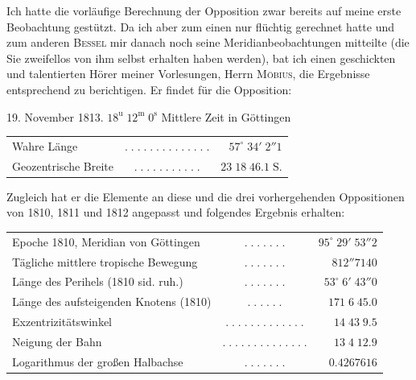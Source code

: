 \par\indent Ich hatte die vorläufige Berechnung der Opposition zwar bereits auf meine erste Beobachtung gestützt. Da ich aber zum einen nur flüchtig gerechnet hatte und zum anderen \textsc{Bessel} mir danach noch seine Meridianbeobachtungen mitteilte (die Sie zweifellos von ihm selbst erhalten haben werden), bat ich einen geschickten und talentierten Hörer meiner Vorlesungen, Herrn \textsc{Möbius}, die Ergebnisse entsprechend zu berichtigen. Er findet für die Opposition:

\begin{center}19. November 1813. $18^{\mathrm u}\;12^{\mathrm m}\;0^{\mathrm s}$ Mittlere Zeit in Göttingen\end{center}
\begin{center}\fontsize{10}{12}\selectfont\setlength{\tabcolsep}{2pt}\renewcommand{\arraystretch}{1.15}\begin{tabular}{lcr}
Wahre Länge & $.\;.\;.\;.\;.\;.\;.\;.\;.\;.\;.\;.\;.\;.$ & $57^\circ\;34'\;2''1$\\
Geozentrische Breite & $.\;.\;.\;.\;.\;.\;.\;.\;.\;.\;.$ & $23\;18\;46.1\;\mathrm{S.}$\\
\end{tabular}\end{center}

\par\indent Zugleich hat er die Elemente an diese und die drei vorhergehenden Oppositionen von 1810, 1811 und 1812 angepasst und folgendes Ergebnis erhalten:

\begin{center}\fontsize{9}{11}\selectfont\setlength{\tabcolsep}{2pt}\renewcommand{\arraystretch}{1.15}\begin{tabular}{lcr}
Epoche 1810, Meridian von Göttingen & $.\;.\;.\;.\;.\;.\;.$ & $95^\circ\;29'\;53''2$\\
Tägliche mittlere tropische Bewegung & $.\;.\;.\;.\;.\;.\;.$ & $812''7140$\\
Länge des Perihels (1810 sid. ruh.) & $.\;.\;.\;.\;.\;.\;.$ & $53^\circ\;6'\;43''0$\\
Länge des aufsteigenden Knotens (1810) & $.\;.\;.\;.\;.\;.$ & $171\;6\;45.0$\\
Exzentrizitätswinkel & $.\;.\;.\;.\;.\;.\;.\;.\;.\;.\;.\;.\;.$ & $14\;43\;9.5$\\
Neigung der Bahn & $.\;.\;.\;.\;.\;.\;.\;.\;.\;.\;.\;.\;.\;.$ & $13\;4\;12.9$\\
Logarithmus der großen Halbachse & $.\;.\;.\;.\;.\;.\;.$ & $0.4267616$\\
\end{tabular}\end{center}

